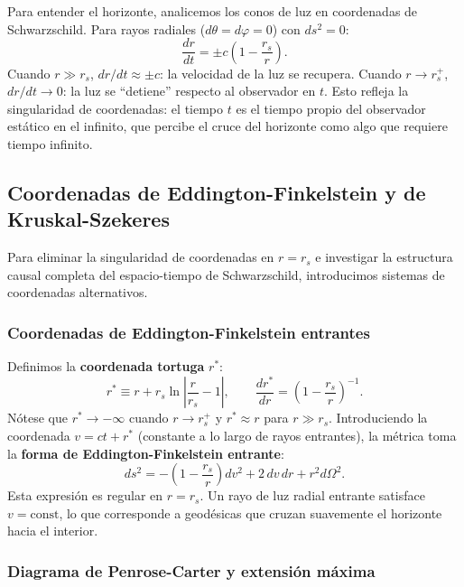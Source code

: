 Para entender el horizonte, analicemos los conos de luz en coordenadas de Schwarzschild. Para rayos radiales ($d\theta = d\varphi = 0$) con $ds^2 = 0$:
\begin{equation}
  \frac{dr}{dt} = \pm c\left(1 - \frac{r_s}{r}\right).
  \label{eq:cono_luz_schwarz}
\end{equation}
Cuando $r \gg r_s$, $dr/dt \approx \pm c$: la velocidad de la luz se recupera. Cuando $r \to r_s^+$, $dr/dt \to 0$: la luz se ``detiene'' respecto al observador en $t$. Esto refleja la singularidad de coordenadas: el tiempo $t$ es el tiempo propio del observador estático en el infinito, que percibe el cruce del horizonte como algo que requiere tiempo infinito.

\subsection{Coordenadas de Eddington-Finkelstein y de Kruskal-Szekeres}

Para eliminar la singularidad de coordenadas en $r = r_s$ e investigar la estructura causal completa del espacio-tiempo de Schwarzschild, introducimos sistemas de coordenadas alternativos.

\subsubsection{Coordenadas de Eddington-Finkelstein entrantes}

Definimos la \textbf{coordenada tortuga} $r^*$:
\begin{equation}
  r^* \equiv r + r_s\ln\!\left|\frac{r}{r_s} - 1\right|, \qquad \frac{dr^*}{dr} = \left(1 - \frac{r_s}{r}\right)^{-1}.
  \label{eq:coordenada_tortuga}
\end{equation}
Nótese que $r^* \to -\infty$ cuando $r \to r_s^+$ y $r^* \approx r$ para $r \gg r_s$. Introduciendo la coordenada $v = ct + r^*$ (constante a lo largo de rayos entrantes), la métrica toma la \textbf{forma de Eddington-Finkelstein entrante}:
\begin{equation}
  ds^2 = -\!\left(1-\frac{r_s}{r}\right)dv^2 + 2\,dv\,dr + r^2 d\Omega^2.
  \label{eq:EF_entrante}
\end{equation}
Esta expresión es regular en $r = r_s$. Un rayo de luz radial entrante satisface $v = \text{const}$, lo que corresponde a geodésicas que cruzan suavemente el horizonte hacia el interior.

\subsubsection{Diagrama de Penrose-Carter y extensión máxima}

